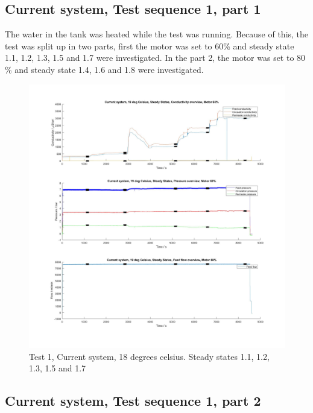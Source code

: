\subsection{Current system, Test sequence 1, part 1}

The water in the tank was heated while the test was running. Because of this, the test was split up in two parts, first the motor was set to 60\% and steady state 1.1, 1.2, 1.3, 1.5 and 1.7 were investigated. In the part 2, the motor was set to 80 \% and steady state 1.4, 1.6 and 1.8 were investigated. 
\begin{figure}[H]
    \centering
    \includegraphics[width=1.1\textwidth]{overview20_60}
    \caption{Test 1, Current system, 18 degrees celsius. Steady states 1.1, 1.2, 1.3, 1.5 and 1.7 }
    \label{fig:PressConn}
\end{figure}

\newpage

\subsection{Current system, Test sequence 1, part 2}
  
